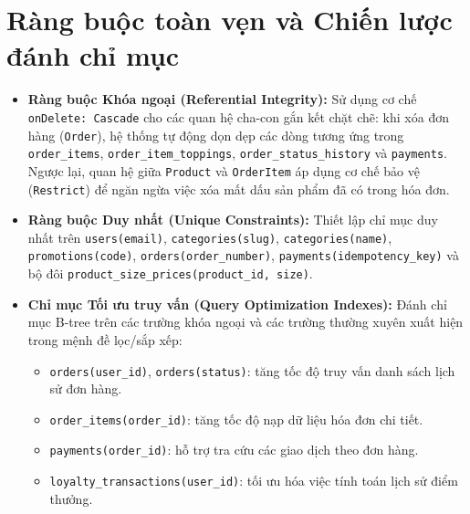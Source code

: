 \documentclass[12pt,a4paper,oneside]{report}
\begin{document}
\section{Ràng buộc toàn vẹn và Chiến lược đánh chỉ mục}
\begin{itemize}
    \item \textbf{Ràng buộc Khóa ngoại (Referential Integrity):} Sử dụng cơ chế \texttt{onDelete: Cascade} cho các quan hệ cha-con gắn kết chặt chẽ: khi xóa đơn hàng (\texttt{Order}), hệ thống tự động dọn dẹp các dòng tương ứng trong \texttt{order\_items}, \texttt{order\_item\_toppings}, \texttt{order\_status\_history} và \texttt{payments}. Ngược lại, quan hệ giữa \texttt{Product} và \texttt{OrderItem} áp dụng cơ chế bảo vệ (\texttt{Restrict}) để ngăn ngừa việc xóa mất dấu sản phẩm đã có trong hóa đơn.
    \item \textbf{Ràng buộc Duy nhất (Unique Constraints):} Thiết lập chỉ mục duy nhất trên \texttt{users(email)}, \texttt{categories(slug)}, \texttt{categories(name)}, \texttt{promotions(code)}, \texttt{orders(order\_number)}, \texttt{payments(idempotency\_key)} và bộ đôi \texttt{product\_size\_prices(product\_id, size)}.
    \item \textbf{Chỉ mục Tối ưu truy vấn (Query Optimization Indexes):} Đánh chỉ mục B-tree trên các trường khóa ngoại và các trường thường xuyên xuất hiện trong mệnh đề lọc/sắp xếp:
    \begin{itemize}
        \item \texttt{orders(user\_id)}, \texttt{orders(status)}: tăng tốc độ truy vấn danh sách lịch sử đơn hàng.
        \item \texttt{order\_items(order\_id)}: tăng tốc độ nạp dữ liệu hóa đơn chi tiết.
        \item \texttt{payments(order\_id)}: hỗ trợ tra cứu các giao dịch theo đơn hàng.
        \item \texttt{loyalty\_transactions(user\_id)}: tối ưu hóa việc tính toán lịch sử điểm thưởng.
    \end{itemize}
\end{itemize}
\end{document}
